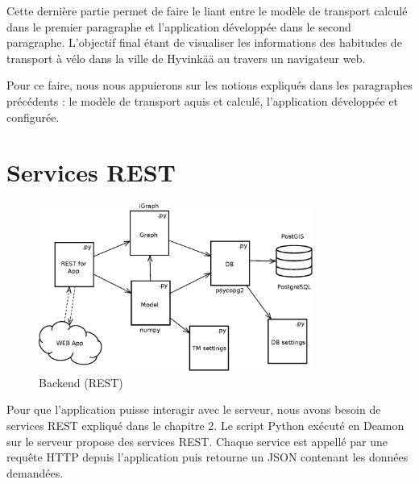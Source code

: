 
Cette dernière partie permet de faire le liant entre le modèle de transport calculé dans le premier paragraphe et l'application développée dans le second paragraphe. L'objectif final étant de visualiser les informations des habitudes de transport à vélo dans la ville de Hyvinkää au travers un navigateur web. 

Pour ce faire, nous nous appuierons sur les notions expliqués dans les paragraphes précédents : le modèle de transport aquis et calculé, l'application développée et configurée.



\section{Services REST}


\begin{figure}
  \centering
  \includegraphics[width=9cm]{img/c01-transp-model/backend.eps}
  \caption{Backend (REST)}
  \label{img.asas}
\end{figure}


Pour que l'application puisse interagir avec le serveur, nous avons besoin de services REST expliqué dans le chapitre 2. Le script Python exécuté en Deamon sur le serveur propose des services REST. Chaque service est appellé par une requête HTTP depuis l'application puis retourne un JSON contenant les données demandées.

